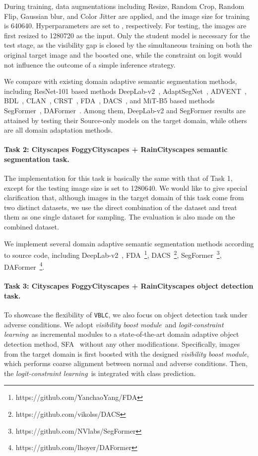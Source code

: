 \documentclass[letterpaper]{article} \usepackage{aaai23}  \usepackage{times}  \usepackage{helvet}  \usepackage{courier}  \usepackage[hyphens]{url}  \usepackage{graphicx} \urlstyle{rm} \def\UrlFont{\rm}  \usepackage{natbib}  \usepackage{caption} \frenchspacing  \setlength{\pdfpagewidth}{8.5in}  \setlength{\pdfpageheight}{11in}  \usepackage{algorithm}
\newcommand{\methodblank}{\texttt{VBLC}}
\newcommand{\boostModuleName}{\textit{visibility boost module}}
\newcommand{\lossModuleName}{\textit{logit-constraint learning}}
\begin{document}
During training, data augmentations including Resize, Random Crop, Random Flip, Gaussian blur, and Color Jitter are applied, and the image size for training is 640640. Hyperparameters are set to , respectively. For testing, the images are first resized to 1280720 as the input. Only the student model is necessary for the test stage, as the visibility gap is closed by the simultaneous training on both the original target image and the boosted one, while the constraint on logit would not influence the outcome of a simple  inference strategy.

We compare with existing domain adaptive semantic segmentation methods, including ResNet-101 based methods DeepLab-v2~\cite{chen2017deeplab}, AdaptSegNet~\cite{tsai2018learning}, ADVENT~\cite{vu2019advent}, BDL~\cite{li2019bidirectional}, CLAN~\cite{luo2019taking}, CRST~\cite{zou2019confidence}, FDA~\cite{yang2020fda}, DACS~\cite{tranheden2021dacs}, and MiT-B5 based methods SegFormer~\cite{xie2021segformer}, DAFormer~\cite{lukas2021daformer}. Among them, DeepLab-v2 and SegFormer results are attained by testing their Source-only models on the target domain, while others are all domain adaptation methods.

\paragraph{Task 2: Cityscapes  FoggyCityscapes + RainCityscapes semantic segmentation task.}
The implementation for this task is basically the same with that of Task 1, except for the testing image size is set to 1280640. We would like to give special clarification that, although images in the target domain of this task come from two distinct datasets, we use the direct combination of the dataset and treat them as one single dataset for sampling. The evaluation is also made on the combined dataset.

We implement several domain adaptive semantic segmentation methods according to source code, including DeepLab-v2~\cite{chen2017deeplab}, FDA~\cite{yang2020fda}\footnote{https://github.com/YanchaoYang/FDA}, DACS~\cite{tranheden2021dacs}\footnote{https://github.com/vikolss/DACS}, SegFormer~\cite{xie2021segformer}\footnote{https://github.com/NVlabs/SegFormer}, DAFormer~\cite{lukas2021daformer}\footnote{https://github.com/lhoyer/DAFormer}.

\paragraph{Task 3: Cityscapes  FoggyCityscapes + RainCityscapes object detection task.} 
To showcase the flexibility of \methodblank, we also focus on object detection task under adverse conditions.
We adopt \boostModuleName~and \lossModuleName~as incremental modules to a state-of-the-art domain adaptive object detection method, SFA~\cite{Wang2021SFA} without any other modifications. Specifically,  images from the target domain is first boosted with the designed \boostModuleName, which performs coarse alignment between normal and adverse conditions. Then, the \lossModuleName~is integrated with class prediction.
\end{document}
